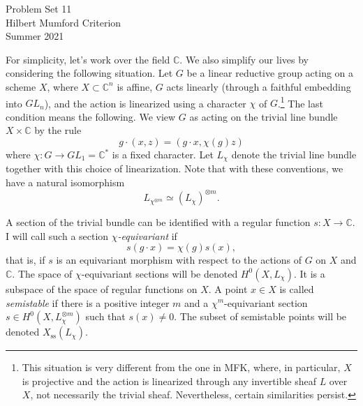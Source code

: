 \documentclass[12pt]{article}
\theoremstyle{definition}
\theoremstyle{theorem}
\begin{document}
\noindent Problem Set 11 \\
\noindent Hilbert Mumford Criterion \\
\noindent Summer 2021 \\

\medskip

\noindent For simplicity, let's work over the field $\mathbb{C}$. We also simplify our lives by considering the following situation. Let $G$ be a linear reductive group acting on a scheme $X$, where $X \subset \mathbb{C}^n$ is affine, $G$ acts linearly (through a faithful embedding into $GL_n$), and the action is linearized using a character $\chi$ of $G$.\footnote{This situation is very different from the one in MFK, where, in particular, $X$ is projective and the action is linearized through any invertible sheaf $L$ over $X$, not necessarily the trivial sheaf. Nevertheless, certain similarities persist.} The last condition means the following. We view $G$ as acting on the trivial line bundle $X \times \mathbb{C}$ by the rule 
\[
g \cdot (x,z) = (g \cdot x, \chi(g)z)
\]
where $\chi : G \to GL_1 = \mathbb{C}^*$ is a fixed character. Let $L_\chi$ denote the trivial line bundle together with this choice of linearization. Note that with these conventions, we have a natural isomorphism 
\[
L_{\chi^{\otimes m}} \simeq (L_\chi)^{\otimes m}. 
\] 

A section of the trivial bundle can be identified with a regular function $s : X \to \mathbb{C}$. I will call such a section \emph{$\chi$-equivariant} if 
\[
s(g \cdot x) = \chi(g)s(x),
\]
that is, if $s$ is an equivariant morphism with respect to the actions of $G$ on $X$ and $\mathbb{C}$. The space of $\chi$-equivariant sections will be denoted $H^0(X, L_\chi)$. It is a subspace of the space of regular functions on $X$. A point $x \in X$ is called \emph{semistable} if there is a positive integer $m$ and a $\chi^m$-equivariant section $s \in H^0(X, L_\chi^{\otimes m})$ such that $s(x) \ne 0$. The subset of semistable points will be denoted $X_{\text{ss}}(L_\chi)$. 
\end{document}
